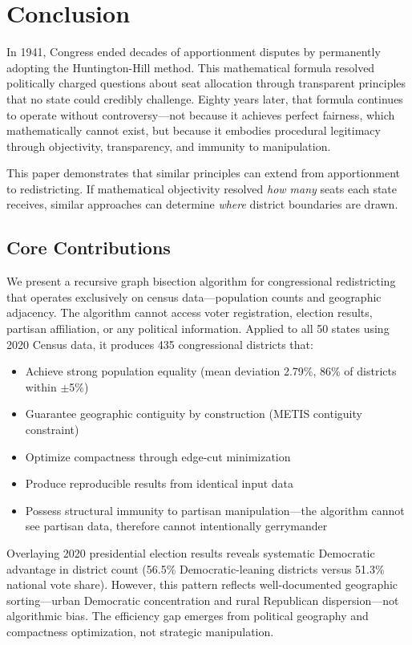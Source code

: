 \section{Conclusion}
\label{sec:conclusion}

In 1941, Congress ended decades of apportionment disputes by permanently adopting the Huntington-Hill method. This mathematical formula resolved politically charged questions about seat allocation through transparent principles that no state could credibly challenge. Eighty years later, that formula continues to operate without controversy—not because it achieves perfect fairness, which mathematically cannot exist, but because it embodies procedural legitimacy through objectivity, transparency, and immunity to manipulation.

This paper demonstrates that similar principles can extend from apportionment to redistricting. If mathematical objectivity resolved \textit{how many} seats each state receives, similar approaches can determine \textit{where} district boundaries are drawn.

\subsection{Core Contributions}

We present a recursive graph bisection algorithm for congressional redistricting that operates exclusively on census data—population counts and geographic adjacency. The algorithm cannot access voter registration, election results, partisan affiliation, or any political information. Applied to all 50 states using 2020 Census data, it produces 435 congressional districts that:

\begin{itemize}
    \item Achieve strong population equality (mean deviation 2.79\%, 86\% of districts within $\pm$5\%)
    \item Guarantee geographic contiguity by construction (METIS contiguity constraint)
    \item Optimize compactness through edge-cut minimization
    \item Produce reproducible results from identical input data
    \item Possess structural immunity to partisan manipulation—the algorithm cannot see partisan data, therefore cannot intentionally gerrymander
\end{itemize}

Overlaying 2020 presidential election results reveals systematic Democratic advantage in district count (56.5\% Democratic-leaning districts versus 51.3\% national vote share). However, this pattern reflects well-documented geographic sorting—urban Democratic concentration and rural Republican dispersion—not algorithmic bias. The efficiency gap emerges from political geography and compactness optimization, not strategic manipulation.


